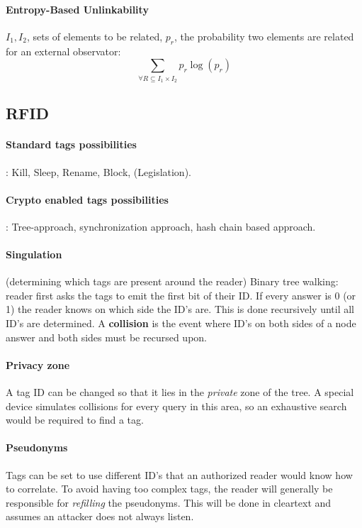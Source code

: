 \documentclass[6pt]{scrartcl}
\begin{document}
\begin{multicols}{4}
\paragraph{Entropy-Based Unlinkability}
$I_1,I_2$, sets of elements to be related, $p_r$, the probability two elements are related for an external observator:
\begin{equation*}
	\sum_{\forall R \subseteq I_1 \times I_2}p_r \log(p_r)
\end{equation*}

\subsection{RFID}
\paragraph{Standard tags possibilities}: Kill, Sleep, Rename, Block, (Legislation).
\paragraph{Crypto enabled tags possibilities}: Tree-approach, synchronization approach, hash chain based approach.
\paragraph{Singulation} (determining which tags are present around the reader) Binary tree walking: reader first asks the tags to emit the first bit of their ID. If every answer is 0 (or 1) the reader knows on which side the ID's are. This is done recursively until all ID's are determined. A \textbf{collision} is the event where ID's on both sides of a node answer and both sides must be recursed upon.

\paragraph{Privacy zone} A tag ID can be changed so that it lies in the \emph{private} zone of the tree. A special device simulates collisions for every query in this area, so an exhaustive search would be required to find a tag. 

\paragraph{Pseudonyms} Tags can be set to use different ID's that an authorized reader would know how to correlate. To avoid having too complex tags, the reader will generally be responsible for \emph{refilling} the pseudonyms. This will be done in cleartext and assumes an attacker does not always listen.


\end{multicols}
\end{document}
